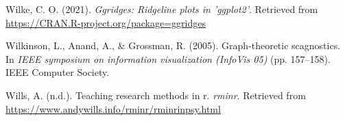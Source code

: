 \documentclass[
  english,
  doc,floatsintext]{apa6}
\newlength{\cslhangindent}
\newlength{\cslentryspacingunit} %
\newenvironment{CSLReferences}[2] %
 {%
  \setlength{\parindent}{0pt}
  \ifodd #1
  \let\oldpar\par
  \def\par{\hangindent=\cslhangindent\oldpar}
  \fi
  \setlength{\parskip}{#2\cslentryspacingunit}
 }%
 {}
\begin{document}
\begin{CSLReferences}{1}{0}
\leavevmode{}%
Wilke, C. O. (2021). \emph{Ggridges: Ridgeline plots in 'ggplot2'}. Retrieved from \url{https://CRAN.R-project.org/package=ggridges}

\leavevmode{}%
Wilkinson, L., Anand, A., \& Grossman, R. (2005). Graph-theoretic scagnostics. In \emph{IEEE symposium on information visualization (InfoVis 05)} (pp. 157--158). IEEE Computer Society.

\leavevmode{}%
Wills, A. (n.d.). Teaching research methods in r. \emph{rminr}. Retrieved from \url{https://www.andywills.info/rminr/rminrinpsy.html}

\end{CSLReferences}

\endgroup
\end{document}
